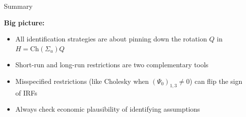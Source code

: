 \documentclass[aspectratio=169,11pt]{beamer}
\begin{document}
\begin{frame}{Summary}

    \textbf{Big picture:}
    \begin{itemize}
        \item All identification strategies are about pinning down the rotation $Q$ in $H = \text{Ch}(\Sigma_u)Q$
        \item Short-run and long-run restrictions are two complementary tools
        \item Misspecified restrictions (like Cholesky when $(\Psi_0)_{1,3}\neq0$) can flip the sign of IRFs
        \item \textcolor{mitred}{Always check economic plausibility of identifying assumptions}
    \end{itemize}
\end{frame}
\end{document}
